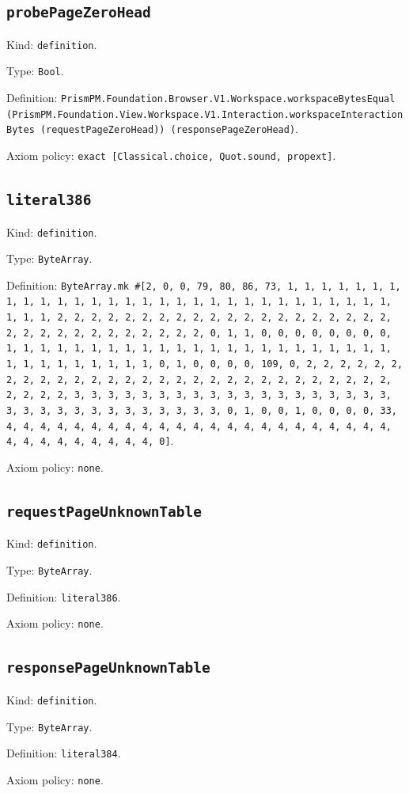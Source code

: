 \documentclass[11pt]{article}
\begin{document}
\subsection*{\texttt{probePageZeroHead}}
\noindent Kind: \texttt{definition}.\par
\noindent Type: \texttt{Bool}.\par
\noindent Definition: \texttt{PrismPM.Foundation.Browser.V1.Workspace.workspaceBytesEqual (PrismPM.Foundation.View.Workspace.V1.Interaction.workspaceInteractionBytes (requestPageZeroHead)) (responsePageZeroHead)}.\par
\noindent Axiom policy: \texttt{exact [Classical.choice, Quot.sound, propext]}.\par
\subsection*{\texttt{literal386}}
\noindent Kind: \texttt{definition}.\par
\noindent Type: \texttt{ByteArray}.\par
\noindent Definition: \texttt{ByteArray.mk \#[2, 0, 0, 79, 80, 86, 73, 1, 1, 1, 1, 1, 1, 1, 1, 1, 1, 1, 1, 1, 1, 1, 1, 1, 1, 1, 1, 1, 1, 1, 1, 1, 1, 1, 1, 1, 1, 1, 1, 1, 2, 2, 2, 2, 2, 2, 2, 2, 2, 2, 2, 2, 2, 2, 2, 2, 2, 2, 2, 2, 2, 2, 2, 2, 2, 2, 2, 2, 2, 2, 2, 2, 0, 1, 1, 0, 0, 0, 0, 0, 0, 0, 0, 1, 1, 1, 1, 1, 1, 1, 1, 1, 1, 1, 1, 1, 1, 1, 1, 1, 1, 1, 1, 1, 1, 1, 1, 1, 1, 1, 1, 1, 1, 1, 1, 0, 1, 0, 0, 0, 0, 109, 0, 2, 2, 2, 2, 2, 2, 2, 2, 2, 2, 2, 2, 2, 2, 2, 2, 2, 2, 2, 2, 2, 2, 2, 2, 2, 2, 2, 2, 2, 2, 2, 2, 2, 3, 3, 3, 3, 3, 3, 3, 3, 3, 3, 3, 3, 3, 3, 3, 3, 3, 3, 3, 3, 3, 3, 3, 3, 3, 3, 3, 3, 3, 3, 3, 3, 0, 1, 0, 0, 1, 0, 0, 0, 0, 33, 4, 4, 4, 4, 4, 4, 4, 4, 4, 4, 4, 4, 4, 4, 4, 4, 4, 4, 4, 4, 4, 4, 4, 4, 4, 4, 4, 4, 4, 4, 4, 4, 0]}.\par
\noindent Axiom policy: \texttt{none}.\par
\subsection*{\texttt{requestPageUnknownTable}}
\noindent Kind: \texttt{definition}.\par
\noindent Type: \texttt{ByteArray}.\par
\noindent Definition: \texttt{literal386}.\par
\noindent Axiom policy: \texttt{none}.\par
\subsection*{\texttt{responsePageUnknownTable}}
\noindent Kind: \texttt{definition}.\par
\noindent Type: \texttt{ByteArray}.\par
\noindent Definition: \texttt{literal384}.\par
\noindent Axiom policy: \texttt{none}.\par
\end{document}
